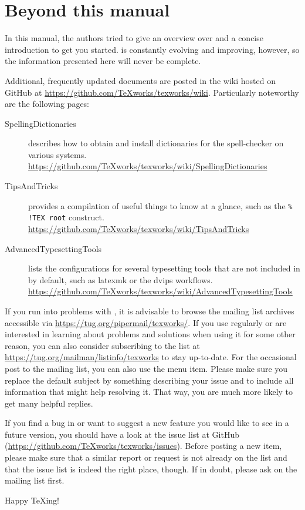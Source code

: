 
\chapter{Beyond this manual}

In this manual, the authors tried to give an overview over {\Tw} and a concise introduction to get you started. {\Tw} is constantly evolving and improving, however, so the information presented here will never be complete.

Additional, frequently updated documents are posted in the wiki hosted on GitHub at \url{https://github.com/TeXworks/texworks/wiki}. Particularly noteworthy are the following pages:
\begin{description}
\item[SpellingDictionaries] describes how to obtain and install dictionaries for the spell-checker on various systems. \url{https://github.com/TeXworks/texworks/wiki/SpellingDictionaries}
\item[TipsAndTricks] provides a compilation of useful things to know at a glance, such as the \verb|% !TEX root| construct. \url{https://github.com/TeXworks/texworks/wiki/TipsAndTricks}
\item[AdvancedTypesettingTools] lists the configurations for several typesetting tools that are not included in {\Tw} by default, such as latexmk or the dvips workflows. \url{https://github.com/TeXworks/texworks/wiki/AdvancedTypesettingTools}
\end{description}

If you run into problems with {\Tw}, it is advisable to browse the mailing list archives accessible via \url{https://tug.org/pipermail/texworks/}. If you use {\Tw} regularly or are interested in learning about problems and solutions when using it for some other reason, you can also consider subscribing to the list at \url{https://tug.org/mailman/listinfo/texworks} to stay up-to-date. For the occasional post to the mailing list, you can also use the \submenu{} menu item. Please make sure you replace the default subject by something describing your issue and to include all information that might help resolving it. That way, you are much more likely to get many helpful replies.

If you find a bug in {\Tw} or want to suggest a new feature you would like to see in a future version, you should have a look at the issue list at GitHub (\url{https://github.com/TeXworks/texworks/issues}). Before posting a new item, please make sure that a similar report or request is not already on the list and that the issue list is indeed the right place, though. If in doubt, please ask on the mailing list first.

Happy {\TeX}ing!